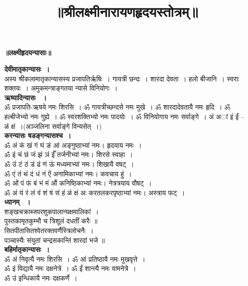 \documentclass[twoside,top=1.7cm, bottom=1.7cm, outer=1cm,landscape, inner=1.5cm,a5paper,]{book}
\begin{document}
\LARGE
\frontmatter
\title{\Huge\bfseries ॥श्रीलक्ष्मीनारायणहृदयस्तोत्रम्॥}
\date{ }
	\begin{titlepage}
	\vfill
	\vfill
		\centering
		\maketitle
	\end{titlepage}

\begin{center}{\bfseries\LARGE ॥लक्ष्मीहृदयन्यासाः॥}\end{center}
{\bfseries देवीमातृकान्यासः~।}\\
अस्य श्रीकलामातृकान्यासस्य प्रजापतिर्ऋषिः~। गायत्री छन्दः~। शारदा देवता~। हलो बीजानि~। स्वराः शक्तयः~। अमुकमन्त्राङ्गतया न्यासे विनियोगः~।\\
{\bfseries ऋष्यादिन्यासः ~।}\\
ॐ प्रजापति-ऋषये नमः शिरसि~। ॐ गायत्रीच्छन्दसे नमः मुखे~। ॐ शारदादेवतायै नमः हृदि~। ॐ हल्बीजेभ्यो नमः गुह्ये~। ॐ स्वरशक्तिभ्यो नमः पादयोः~। ॐ विनियोगाय नमः सर्वाङ्गे~।
अं अां इं ईं -- ळं क्षं~।(अञ्जलिना सर्वाङ्गे विन्यसेत्~।)\\
{\bfseries करन्यासः षडङ्गन्यासश्च~।}\\ 
ॐ अं कं खं गं घं ङं आं  अङ्गुष्ठाभ्यां नमः। हृदयाय नमः~।\\
ॐ इं चं छं जं झं ञं ईँ     तर्जनीभ्यां नमः। शिरसे स्वाहा~।\\
ॐ उं टं ठं डं ढं णं ऊं    	मध्यमाभ्यां नमः। शिखायै वषट्‌~।\\
ॐ एं तं थं दं धं नं ऐं   	अनामिकाभ्यां नमः। कवचाय हुं~।\\
ॐ ओं पं फं बं भं मं औं 	कनिष्ठिकाभ्यां नमः। नेत्रत्रयाय वौषट्‌~।\\
ॐ अं यं रं लं वं शं षं सं हं ळं क्षं अः  करतलकरपृष्ठाभ्यां नमः। अस्त्राय फट्‌~।\\
{\bfseries ध्यानम् ~।}\\
शङ्खचक्राब्जपरशुकपालान्यक्षमालिकां~।\\
पुस्तकामृतकुम्भौ च त्रिशूलं दधतीं करैः ॥\\
सितपीतासितश्वेतरक्तवर्णैस्त्रिलोचनैः~।\\
पञ्चास्यैः संयुतां चन्द्रसकान्तिं शारदां भजे ॥\\[10pt]
{\bfseries बहिर्मातृकान्यासः~।}\\
ॐ अं निवृत्यै नमः शिरसि~।
ॐ आं प्रतिष्ठायै नमः मुखवृत्ते~।\\
ॐ इं विद्यायै नमः दक्षनेत्रे~।
ॐ ईं शान्त्यै नमः वामनेत्रे~।\\
ॐ उं इन्धिकायै नमः दक्षकर्णे~।
\end{document}
